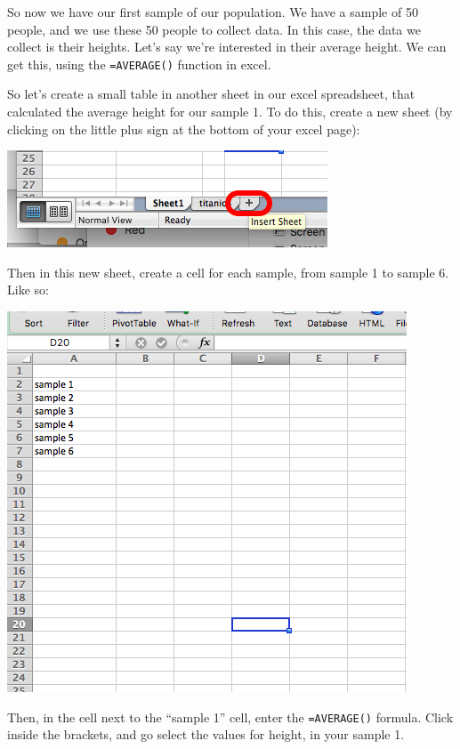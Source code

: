 \documentclass[]{book}
\theoremstyle{definition}
\theoremstyle{definition}
\theoremstyle{definition}
\theoremstyle{remark}
\begin{document}
So now we have our first sample of our population. We have a sample of
50 people, and we use these 50 people to collect data. In this case, the
data we collect is their heights. Let's say we're interested in their
average height. We can get this, using the \texttt{=AVERAGE()} function
in excel.

So let's create a small table in another sheet in our excel spreadsheet,
that calculated the average height for our sample 1. To do this, create
a new sheet (by clicking on the little plus sign at the bottom of your
excel page):

\includegraphics{imgs/new_sheet_2.png}

Then in this new sheet, create a cell for each sample, from sample 1 to
sample 6. Like so:

\includegraphics{imgs/set_for_avgs.png}

Then, in the cell next to the ``sample 1'' cell, enter the
\texttt{=AVERAGE()} formula. Click inside the brackets, and go select
the values for height, in your sample 1.
\end{document}
